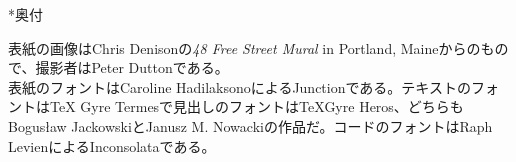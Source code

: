 \begin{chapter}*{奥付}

表紙の画像はChris Denisonの\emph{48 Free Street Mural} in Portland, Maineからのもので、撮影者はPeter Duttonである。\\

\noindent
表紙のフォントはCaroline HadilaksonoによるJunctionである。テキストのフォントは\TeX
Gyre Termesで見出しのフォントは\TeX Gyre Heros、どちらもBogus\l{}aw
JackowskiとJanusz M. Nowackiの作品だ。コードのフォントはRaph LevienによるInconsolataである。

\end{chapter}

\pagebreak
\thispagestyle{empty}
\mbox{}

